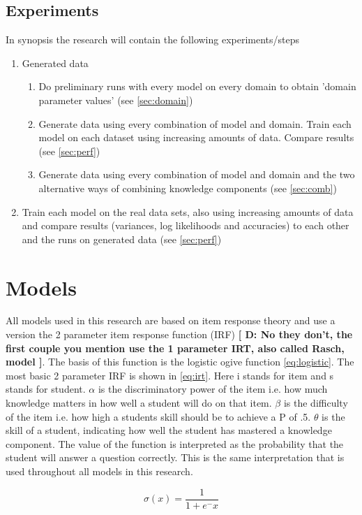 \documentclass{scrartcl}
\providecommand{\comm}[1]{{\bf[ #1 ]}}
\providecommand{\commd}[1]{\comm{D: {#1}}}
\begin{document}
\subsection{Experiments}
In synopsis the research will contain the following experiments/steps
\begin{enumerate}
\item Generated data
\begin{enumerate}
\item Do preliminary runs with every model on every domain to obtain 'domain parameter values' (see \ref{sec:domain})
\item Generate data using every combination of model and domain. Train each model on each dataset using increasing amounts of data. Compare results (see \ref{sec:perf})
\item Generate data using every combination of model and domain and the two alternative ways of combining knowledge components (see \ref{sec:comb})
\end{enumerate}
\item Train each model on the real data sets, also using increasing amounts of data and compare results (variances, log likelihoods and accuracies) to each other and the runs on generated data (see \ref{sec:perf})
\end{enumerate}


\section{Models}
All models used in this research are based on item response theory and use a version the 2 parameter item response function (IRF) \commd{No they don't, the first couple you mention use the 1 parameter IRT, also called Rasch, model}. The basis of this function is the logistic ogive function \ref{eq:logistic}. The most basic 2 parameter IRF is shown in \ref{eq:irt}. Here i stands for item and s stands for student. $\alpha$ is the discriminatory power of the item i.e. how much knowledge matters in how well a student will do on that item. $\beta$ is the difficulty of the item i.e. how high a students skill should be to achieve a P of .5. $\theta$ is the skill of a student, indicating how well the student has mastered a knowledge component. The value of the function is interpreted as the probability that the student will answer a question correctly. This is the same interpretation that is used throughout all models in this research.

\begin{equation}
\label{eq:logistic}
\sigma(x) = \frac{1}{1+e^-x}
\end{equation}
\end{document}
